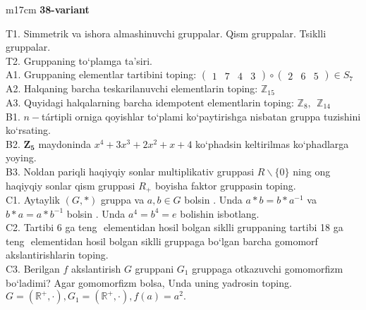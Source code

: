 \documentclass{article}
\begin{document}
\begin{tabular}{m{17cm}}
\textbf{38-variant}
\newline

T1. Simmetrik va ishora almashinuvchi gruppalar. Qism gruppalar. Tsiklli gruppalar. \\
T2. Gruppaning to`plamga ta'siri. \\
A1. Gruppaning elementlar tartibini toping: \(\begin{pmatrix}
1 & 7 & 4 & 3
\end{pmatrix} \circ \begin{pmatrix}
2 & 6 & 5
\end{pmatrix} \in S_{7}\) \\
A2. Halqaning barcha teskarilanuvchi elementlarin toping: \(\mathbb{Z}_{15}\) \\
A3. Quyidagi halqalarning barcha idempotent elementlarin toping: \(\mathbb{Z}_{8},\ \ \mathbb{Z}_{14}\) \\
B1. \(n -\)tártipli orniga qoyishlar to`plami ko`paytirishga nisbatan gruppa tuzishini ko`rsating. \\
B2. \(\mathbf{Z}_{\mathbf{5}}\) maydoninda \(x^{4} + 3x^{3} + 2x^{2} + x + 4\) ko`phadsin keltirilmas ko`phadlarga yoying. \\
B3. Noldan pariqli haqiyqiy sonlar multiplikativ gruppasi \(R\backslash\{ 0\}\) ning o\textquotesingle ng haqiyqiy sonlar qism gruppasi \(R_{+}\) boyisha faktor gruppasin toping. \\
C1. Aytaylik \((G,*)\) gruppa va \(a,b \in G\) bo\textquotesingle lsin . Unda \(a*b = b*a^{- 1}\) va \(b*a = a*b^{- 1}\) bo\textquotesingle lsin . Unda \(a^{4} = b^{4} = e\) bolishin isbotlang. \\
C2. Tartibi 6 ga teng \(< a >\) elementidan hosil bo\textquotesingle lgan siklli gruppaning tartibi 18 ga teng \(< b >\) elementidan hosil bo\textquotesingle lgan siklli gruppaga bo`lgan barcha gomomorf akslantirishlarin toping. \\
C3. Berilgan \(f\) akslantirish \(G\) gruppani \(G_{1}\) gruppaga o\textquotesingle tkazuvchi gomomorfizm bo`ladimi? Agar gomomorfizm bolsa, Unda uning yadrosin toping. \(G = \left( \mathbb{R}^{+}, \cdot \right),G_{1} = \left( \mathbb{R}^{+}, \cdot \right),f(a) = a^{2}.\) \\

\end{tabular}
\vspace{1cm}
\end{document}
